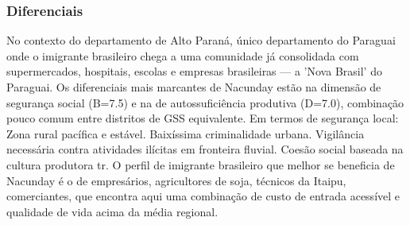 \subsubsection*{Diferenciais}\label{dif-nacunday-1008}
No contexto do departamento de Alto Paraná, único departamento do Paraguai onde o imigrante brasileiro chega a uma comunidade já consolidada com supermercados, hospitais, escolas e empresas brasileiras — a 'Nova Brasil' do Paraguai. Os diferenciais mais marcantes de Nacunday estão na dimensão de segurança social (B=7.5) e na de autossuficiência produtiva (D=7.0), combinação pouco comum entre distritos de GSS equivalente. Em termos de segurança local: Zona rural pacífica e estável. Baixíssima criminalidade urbana. Vigilância necessária contra atividades ilícitas em fronteira fluvial. Coesão social baseada na cultura produtora tr. O perfil de imigrante brasileiro que melhor se beneficia de Nacunday é o de empresários, agricultores de soja, técnicos da Itaipu, comerciantes, que encontra aqui uma combinação de custo de entrada acessível e qualidade de vida acima da média regional.
